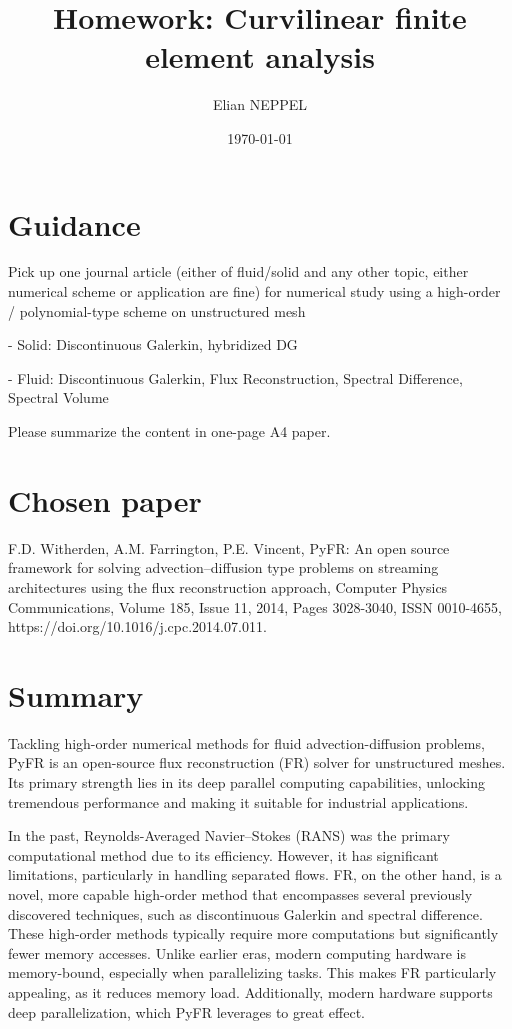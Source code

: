 \documentclass[12pt]{article}
\title{Homework: Curvilinear finite element analysis}
\author{Elian NEPPEL}
\date{\today}
\begin{document}
\maketitle

\section*{Guidance}

Pick up one journal article (either of fluid/solid and any other topic, either numerical scheme or application are fine) for numerical study using a high-order / polynomial-type scheme on unstructured mesh

- Solid: Discontinuous Galerkin, hybridized DG

- Fluid: Discontinuous Galerkin, Flux Reconstruction, Spectral Difference, Spectral Volume

Please summarize the content in one-page A4 paper.

\section*{Chosen paper}

F.D. Witherden, A.M. Farrington, P.E. Vincent,
PyFR: An open source framework for solving advection–diffusion type problems on streaming architectures using the flux reconstruction approach,
Computer Physics Communications,
Volume 185, Issue 11,
2014,
Pages 3028-3040,
ISSN 0010-4655,
https://doi.org/10.1016/j.cpc.2014.07.011.

\newpage
\section{Summary}

Tackling high-order numerical methods for fluid advection-diffusion problems, PyFR is an open-source flux reconstruction (FR) solver for unstructured meshes. Its primary strength lies in its deep parallel computing capabilities, unlocking tremendous performance and making it suitable for industrial applications.

In the past, Reynolds-Averaged Navier–Stokes (RANS) was the primary computational method due to its efficiency. However, it has significant limitations, particularly in handling separated flows. FR, on the other hand, is a novel, more capable high-order method that encompasses several previously discovered techniques, such as discontinuous Galerkin and spectral difference. These high-order methods typically require more computations but significantly fewer memory accesses. Unlike earlier eras, modern computing hardware is memory-bound, especially when parallelizing tasks. This makes FR particularly appealing, as it reduces memory load. Additionally, modern hardware supports deep parallelization, which PyFR leverages to great effect.
\end{document}
